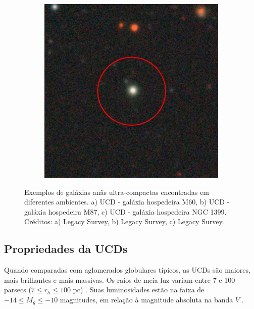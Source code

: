 \begin{figure}[!ht]
\begin{subfigure}[b]{0.3\textwidth}
        \caption{}
    \end{subfigure}
    \begin{subfigure}[b]{0.3\textwidth}
        \includegraphics[width=\textwidth]{Images/ucds_exp/UCD_NGC1399.png}
        \caption{}
    \end{subfigure}
    \caption{Exemplos de galáxias anãs ultra-compactas encontradas em diferentes ambientes. a) UCD - galáxia hospedeira M60, b) UCD - galáxia hospedeira M87, c) UCD - galáxia hospedeira NGC 1399. Créditos: a) Legacy Survey, b) Legacy Survey, c) Legacy Survey.}
    \label{UCDs_exp}
\end{figure}

\subsection{Propriedades da UCDs}\label{subsec:propriedade}
Quando comparadas com aglomerados globulares típicos, as UCDs são maiores, mais brilhantes e mais massivas. Os raios de meia-luz variam entre 7 e 100 parsecs ($7 \leq r_h \leq 100$ pc) \citep{Mieske_2008_1}. Suas luminosidades estão na faixa de $-14 \leq M_g \leq -10$ magnitudes, em relação à magnitude absoluta na banda $V$ \citep{Voggel_2016}.

